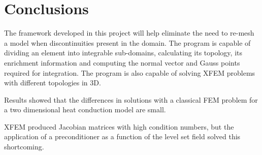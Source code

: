 \section{Conclusions}
\label{sec:implementation_conclusions}



The framework developed in this project will help eliminate the need to re-mesh a model when discontinuities present in the domain. The program is capable of dividing an element into integrable sub-domains, calculating its topology, its enrichment information and computing the normal vector and Gauss points required for integration. The program is also capable of solving XFEM problems with different topologies in 3D.

Results showed that the differences in solutions with a classical FEM problem for a two dimensional heat conduction model are small.

XFEM produced Jacobian matrices with high condition numbers, but the application of a preconditioner as a function of the level set field solved this shortcoming.

%
